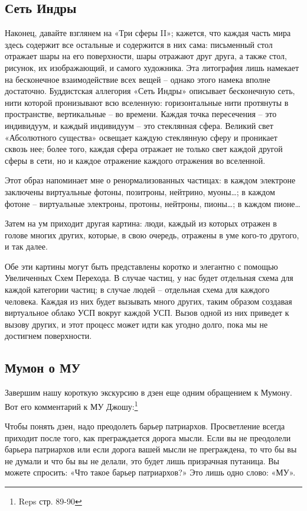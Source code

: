 \documentclass[../main.tex]{subfiles}
\begin{document}
\subsection{Сеть Индры}

Наконец, давайте взглянем на «Три сферы II»; кажется, что каждая часть мира здесь содержит все остальные и содержится в них сама: письменный стол отражает шары на его поверхности, шары отражают друг друга, а также стол, рисунок, их изображающий, и самого художника. Эта литография лишь намекает на бесконечное взаимодействие всех вещей \--- однако этого намека вполне достаточно. Буддистская аллегория «Сеть Индры» описывает бесконечную сеть, нити которой пронизывают всю вселенную: горизонтальные нити протянуты в пространстве, вертикальные \--- во времени. Каждая точка пересечения \--- это индивидуум, и каждый индивидуум \--- это стеклянная сфера. Великий свет «Абсолютного существа» освещает каждую стеклянную сферу и проникает сквозь нее; более того, каждая сфера отражает не только свет каждой другой сферы в сети, но и каждое отражение каждого отражения во вселенной.

Этот образ напоминает мне о ренормализованных частицах: в каждом электроне заключены виртуальные фотоны, позитроны, нейтрино, муоны\ldots; в каждом фотоне \--- виртуальные электроны, протоны, нейтроны, пионы\ldots; в каждом пионе\ldots{}

Затем на ум приходит другая картина: люди, каждый из которых отражен в голове многих других, которые, в свою очередь, отражены в уме кого-то другого, и так далее.

Обе эти картины могут быть представлены коротко и элегантно с помощью Увеличенных Схем Перехода. В случае частиц, у нас будет отдельная схема для каждой категории частиц; в случае людей \--- отдельная схема для каждого человека. Каждая из них будет вызывать много других, таким образом создавая виртуальное облако УСП вокруг каждой УСП. Вызов одной из них приведет к вызову других, и этот процесс может идти как угодно долго, пока мы не достигнем поверхности.


\subsection{Мумон о МУ}

Завершим нашу короткую экскурсию в дзен еще одним обращением к Мумону. Вот его комментарий к МУ Джошу:\footnote{Reps стр. 89-90}

Чтобы понять дзен, надо преодолеть барьер патриархов. Просветление всегда приходит после того, как преграждается дорога мысли. Если вы не преодолели барьера патриархов или если дорога вашей мысли не преграждена, то что бы вы не думали и что бы вы не делали, это будет лишь призрачная путаница. Вы можете спросить: «Что такое барьер патриархов?» Это лишь одно слово: «МУ».
\end{document}
